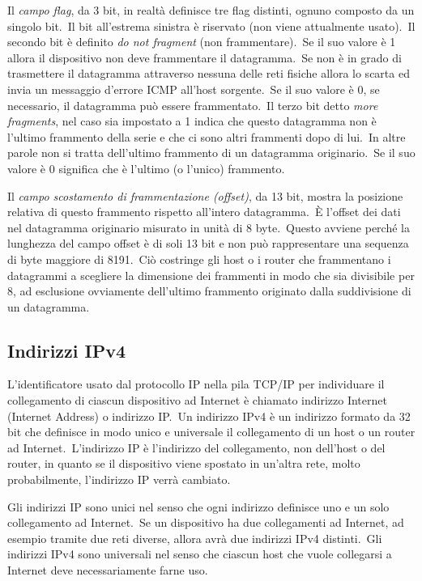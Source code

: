Il \emph{campo flag}, da 3 bit, in realtà definisce tre flag distinti, ognuno composto da un singolo bit.\
Il bit all'estrema sinistra è riservato (non viene attualmente usato).\
Il secondo bit è definito \emph{do not fragment} (non frammentare).\
Se il suo valore è 1 allora il dispositivo non deve frammentare il datagramma.\
Se non è in grado di trasmettere il datagramma attraverso nessuna delle reti fisiche allora lo scarta ed invia un messaggio d'errore ICMP all'host sorgente.\
Se il suo valore è 0, se necessario, il datagramma può essere frammentato.\
Il terzo bit detto \emph{more fragments}, nel caso sia impostato a 1 indica che questo datagramma non è l'ultimo frammento della serie e che ci sono altri frammenti dopo di lui.\
In altre parole non si tratta dell'ultimo frammento di un datagramma originario.\
Se il suo valore è 0 significa che è l'ultimo (o l'unico) frammento.

Il \emph{campo scostamento di frammentazione (offset)}, da 13 bit, mostra la posizione relativa di questo frammento rispetto all'intero datagramma.\
È l'offset dei dati nel datagramma originario misurato in unità di 8 byte.\
Questo avviene perché la lunghezza del campo offset è di soli 13 bit e non può rappresentare una sequenza di byte maggiore di 8191.\
Ciò costringe gli host o i router che frammentano i datagrammi a scegliere la dimensione dei frammenti in modo che sia divisibile per 8, ad esclusione ovviamente dell'ultimo frammento originato dalla suddivisione di un datagramma.

\subsection{Indirizzi IPv4}

L'identificatore usato dal protocollo IP nella pila TCP/IP per individuare il collegamento di ciascun dispositivo ad Internet è chiamato indirizzo Internet (Internet Address) o indirizzo IP.\
Un indirizzo IPv4 è un indirizzo formato da 32 bit che definisce in modo unico e universale il collegamento di un host o un router ad Internet.\
L'indirizzo IP è l'indirizzo del collegamento, non dell'host o del router, in quanto se il dispositivo viene spostato in un'altra rete, molto probabilmente, l'indirizzo IP verrà cambiato.

Gli indirizzi IP sono unici nel senso che ogni indirizzo definisce uno e un solo collegamento ad Internet.\
Se un dispositivo ha due collegamenti ad Internet, ad esempio tramite due reti diverse, allora avrà due indirizzi IPv4 distinti.\
Gli indirizzi IPv4 sono universali nel senso che ciascun host che vuole collegarsi a Internet deve necessariamente farne uso.

